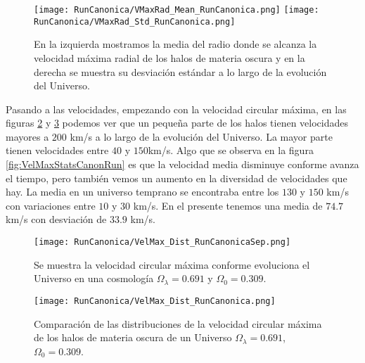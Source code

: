 \begin{figure}[ht!]
    \centering
    \texttt{[image: RunCanonica/VMaxRad\_Mean\_RunCanonica.png]}
    \texttt{[image: RunCanonica/VMaxRad\_Std\_RunCanonica.png]}
    \caption[Media y desviación estándar del Radio donde se alcanza la velocidad máxima radial de un Universo $\Omega_\lambda = 0.691 $, $\Omega_0 = 0.309$]{\footnotesize En la izquierda mostramos la media del radio donde se alcanza la velocidad máxima radial de los halos de materia oscura y en la derecha se muestra su desviación estándar a lo largo de la evolución del Universo.}
    \label{fig:VMaxRadStatsCanonRun}
\end{figure}

Pasando a las velocidades, empezando con la velocidad circular máxima, en las figuras \ref{fig:VelMaxDistCanonRunSep} y \ref{fig:VelMaxDistCanonRun} podemos ver que un pequeña parte de los halos tienen velocidades mayores a $200$ km/s a lo largo de la evolución del Universo. La mayor parte tienen velocidades entre $40$ y $150$km/s. Algo que se observa en la figura \ref{fig:VelMaxStatsCanonRun} es que la velocidad media disminuye conforme avanza el tiempo, pero también vemos un aumento en la diversidad de velocidades que hay. La media en un universo temprano se encontraba entre los $130$ y $150$ km/s con variaciones entre $10$ y $30$ km/s. En el presente tenemos una media de $74.7$ km/s con desviación de $33.9$ km/s. 

\begin{figure}[ht!]
    \centering
    \texttt{[image: RunCanonica/VelMax\_Dist\_RunCanonicaSep.png]}
    \caption[Velocidad circular máxima en la evolución de un Universo $\Omega_\lambda = 0.691 $, $\Omega_0 = 0.309$]{\footnotesize Se muestra la velocidad circular máxima conforme evoluciona el Universo en una cosmología $\Omega_\lambda = 0.691 $ y $\Omega_0 = 0.309$.}
    \label{fig:VelMaxDistCanonRunSep}
\end{figure}

\begin{figure}[ht!]
    \centering
    \texttt{[image: RunCanonica/VelMax\_Dist\_RunCanonica.png]}
    \caption[Distribución de la velocidad circular máxima de un Universo $\Omega_\lambda = 0.691 $, $\Omega_0 = 0.309$]{\footnotesize Comparación de las distribuciones de la velocidad circular máxima de los halos de materia oscura de un Universo $\Omega_\lambda = 0.691 $, $\Omega_0 = 0.309$.}
    \label{fig:VelMaxDistCanonRun}
\end{figure}

